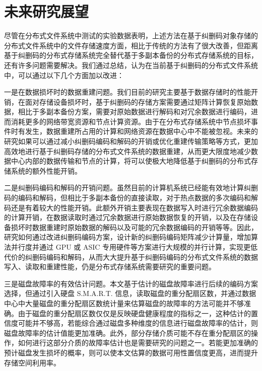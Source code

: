\section{未来研究展望}
尽管在分布式文件系统中测试的实验数据表明，上述方法在基于纠删码对象存储的分布式文件系统中的文件存储速度方面，相比于传统的方法有了很大改善，但距离基于纠删码的分布式存储系统完全替代基于多副本备份的分布式存储系统的目标，还有许多问题需要解决。我们通过总结，认为在当前基于纠删码的分布式文件系统中，可以通过以下几个方面加以改进：

一是在数据损坏时的数据重建问题。我们目前的研究主要基于数据存储时的性能开销，在面对存储设备损坏时，基于纠删码的存储方案需要通过矩阵计算恢复原始数据，相比于多副本备份方案，需要对原始数据进行解码和对冗余数据进行编码，进而消耗更多的网络带宽资源和节点计算资源。由于在分布式存储系统中节点损坏事件时有发生，数据重建所占用的计算和网络资源在数据中心中不能被忽视。未来的研究如果可以通过减小纠删码编码和解码的开销或优化重建传输策略等方式，更加高效地进行基于纠删码存储的分布式文件系统的数据重建，从而更大限度地减少数据中心内部的数据传输和节点的计算，将可以使极大地降低基于纠删码的分布式存储系统的额外性能开销。

二是纠删码编码和解码的开销问题。虽然目前的计算机系统已经能有效地计算纠删码的编码和解码，但相比于多副本备份的直接读取，对于热点数据的多次编码和解码还是有着较大的性能开销。此额外开销主要表现在数据写入时进行冗余数据编码的计算开销，在数据读取时通过冗余数据进行原始数据恢复的开销，以及在存储设备损坏时数据重建时原始数据的解码以及可能的冗余数据编码的开销等等。因此，研究如何通过改进纠删码编码方案，设计新的纠删码编码矩阵减少计算量，增加算法并行度并通过 GPU 或 ASIC 专用硬件等方案进行大规模的并行计算，实现更低代价的纠删码编码和解码，从而大大提升基于纠删码编码的分布式文件系统的数据写入、读取和重建性能，仍是分布式存储系统需要研究的重要问题。

三是磁盘故障率的有效估计问题。本文基于估计的磁盘故障率进行后续的编码方案选择，但通过引入硬盘 S.M.A.R.T. 信息，读取磁盘的重分配扇区数，并通过数据中心中大量磁盘的重分配扇区数统计量来估算磁盘的故障率的方法可能并不够准确。由于磁盘的重分配扇区数仅仅是反映硬盘健康程度的指标之一，这种估计的置信度可能并不够高，若能综合通过磁盘多种维度的信息进行磁盘故障率的估计，则磁盘故障率的估计值能更加准确。此外，部分存储介质可能不存在重分配扇区的操作，如何进行这部分介质的故障率估计也是需要研究的问题之一。若能更加准确的预计磁盘发生损坏的概率，则可以使本文估算的数据可用性置信度更高，进而提升存储空间利用率。
